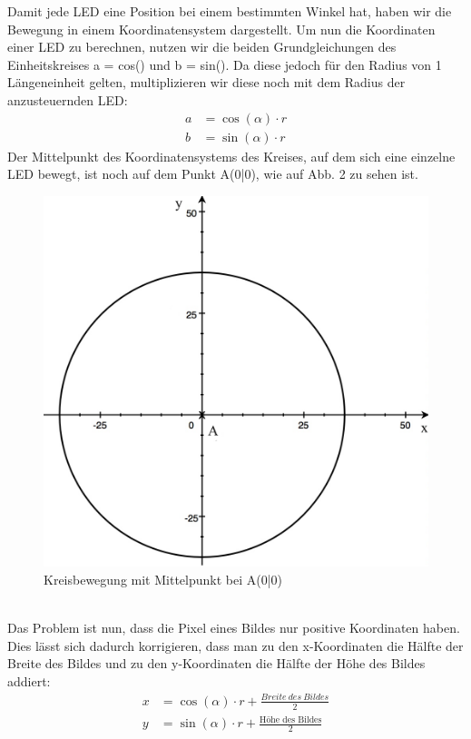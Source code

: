 \documentclass [a4paper, 11pt] {article}
\begin{document}
Damit jede LED eine Position bei einem bestimmten Winkel hat, haben wir die Bewegung in einem Koordinatensystem dargestellt. Um nun die Koordinaten einer LED zu berechnen, nutzen wir die beiden Grundgleichungen des Einheitskreises a = cos(\textalpha) und
b = sin(\textalpha). Da diese jedoch für den Radius von 1 Längeneinheit gelten, multiplizieren wir diese noch mit dem Radius der anzusteuernden LED:
\begin{align}
a &= \cos (\alpha) \cdot r \\
b &= \sin (\alpha) \cdot r 
\end{align}
Der Mittelpunkt des Koordinatensystems des Kreises, auf dem sich eine einzelne LED bewegt, ist noch auf dem Punkt A(0\big|0), wie auf Abb. 2 zu sehen ist. \\
\begin{figure}[h]
	\centering
	\includegraphics[width=12cm]{dia1.png}
	\caption{Kreisbewegung mit Mittelpunkt bei A(0\big|0)}
\end{figure}\\
Das Problem ist nun, dass die Pixel eines Bildes nur positive Koordinaten haben. Dies lässt sich dadurch korrigieren, dass man zu den x-Koordinaten die Hälfte der Breite des Bildes und zu den y-Koordinaten die Hälfte der Höhe des Bildes addiert:
\begin{align}
x &= \cos (\alpha) \cdot r + \frac{Breite \ des \ Bildes}{2} \\
y &= \sin (\alpha) \cdot r +  \frac{\text{Höhe\ des\ Bildes}}{2}
\end{align}
\end{document}
